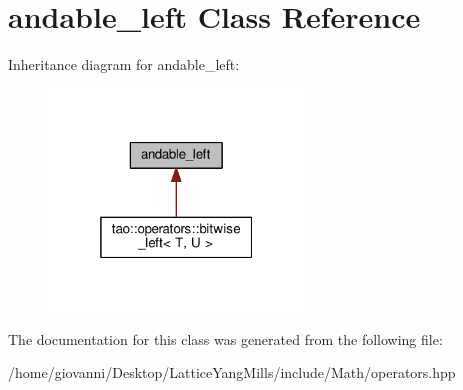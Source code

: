 \hypertarget{classandable__left}{}\section{andable\+\_\+left Class Reference}
\label{classandable__left}


Inheritance diagram for andable\+\_\+left\+:\nopagebreak
\begin{figure}[H]
\begin{center}
\leavevmode
\includegraphics[width=193pt]{classandable__left__inherit__graph}
\end{center}
\end{figure}


The documentation for this class was generated from the following file\+:\begin{DoxyCompactItemize}
\item 
/home/giovanni/\+Desktop/\+Lattice\+Yang\+Mills/include/\+Math/operators.\+hpp\end{DoxyCompactItemize}
